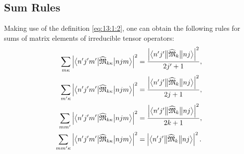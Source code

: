\subsection{Sum Rules}\label{sec:13.1.2}
Making use of the definition \eqref{eq:13:1:2}, one can obtain the following rules for sums of matrix elements of irreducible tensor operators:
\begin{align}
\sum_{m \kappa}\left|
\bigl\langle n^{\prime} j^{\prime}m^{\prime} \big| \widehat{\mathfrak{M}}_{k \kappa} \big|  n j m \bigr\rangle\right|^{2} & =\frac{\left|
\bigl\langle n^{\prime} j^{\prime} \big\Vert \widehat{\mathfrak{M}}_{k} \big\Vert  n j \bigr\rangle\right|^{2}}{2 j^{\prime}+1},  \label{eq:13:1:4}\\
\sum_{m^{\prime} \kappa}\left|
\bigl\langle n^{\prime} j^{\prime}m^{\prime} \big| \widehat{\mathfrak{M}}_{k \kappa} \big|  n j m \bigr\rangle\right|^{2} & =\frac{\left|
\bigl\langle n^{\prime} j^{\prime} \big\Vert \widehat{\mathfrak{M}}_{k} \big\Vert  n j \bigr\rangle\right|^{2}}{2 j+1},  \label{eq:13:1:5}\\
\sum_{m m^{\prime}}\left|
\bigl\langle n^{\prime} j^{\prime}m^{\prime} \big| \widehat{\mathfrak{M}}_{k \kappa} \big|  n j m \bigr\rangle\right|^{2} & =\frac{\left|
\bigl\langle n^{\prime} j^{\prime} \big\Vert \widehat{\mathfrak{M}}_{k} \big\Vert  n j \bigr\rangle\right|^{2}}{2 k+1},  \label{eq:13:1:6}\\
\sum_{m m^{\prime} \kappa}\left|
\bigl\langle n^{\prime} j^{\prime}m^{\prime} \big| \widehat{\mathfrak{M}}_{k \kappa} \big|  n j m \bigr\rangle\right|^{2} & =\left|
\bigl\langle n^{\prime} j^{\prime} \big\Vert \widehat{\mathfrak{M}}_{k} \big\Vert  n j \bigr\rangle\right|^{2}. \label{eq:13:1:7}
\end{align}
